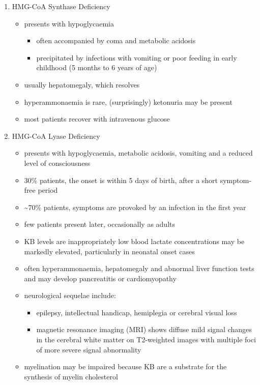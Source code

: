 \documentclass[12pt]{scrartcl}
\begin{document}
\begin{enumerate}
\item HMG-CoA Synthase Deficiency
\label{sec:org3dfdc19}
\begin{itemize}
\item presents with hypoglycaemia
\begin{itemize}
\item often accompanied by coma and metabolic acidosis
\item precipitated by infections with vomiting or poor feeding in early
childhood (5 months to 6 years of age)
\end{itemize}
\item usually hepatomegaly, which resolves
\item hyperammonaemia is rare, (surprisingly) ketonuria may be present
\item most patients recover with intravenous glucose
\end{itemize}

\item HMG-CoA Lyase Deficiency
\label{sec:org54fb80b}
\begin{itemize}
\item presents with hypoglycaemia, metabolic acidosis, vomiting and a
reduced level of consciousness
\item 30\% patients, the onset is within 5 days of birth, after a short symptom-free period
\item \textasciitilde{}70\% patients, symptoms are provoked by an infection in the first year
\item few patients present later, occasionally as adults
\item KB levels are inappropriately low blood lactate concentrations
may be markedly elevated, particularly in neonatal onset cases
\item often hyperammonaemia, hepatomegaly and abnormal liver function tests and
may develop pancreatitis or cardiomyopathy
\item neurological sequelae include:
\begin{itemize}
\item epilepsy, intellectual handicap, hemiplegia or cerebral visual loss
\item magnetic resonance imaging (MRI) shows diffuse mild signal changes
in the cerebral white matter on T2-weighted images with multiple
foci of more severe signal abnormality
\end{itemize}
\item myelination may be impaired because KB are a substrate for the
synthesis of myelin cholesterol
\end{itemize}
\end{enumerate}
\end{document}
